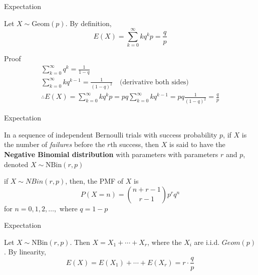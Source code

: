 \documentclass{beamer}
\newcommand{\tb}[1]{\textbf{#1}}
\newcommand{\ti}[1]{\textit{#1}}
\begin{document}
\begin{frame}{Expectation}
    \begin{example} \label{ex:geometric_expectation}
        Let $X \sim \text{Geom}(p)$. By definition,
        \[
            E(X) = \sum^\infty_{k=0} k q ^k p = \frac{q}{p}
        \]
    \end{example}
    \begin{block}{Proof}
        \[
            \begin{gathered}
                \sum^\infty_{k=0} q^k = \frac{1}{1-q}\\
                \sum^{\infty}_{k=0} kq^{k-1} =\frac{1}{(1-q)^2}\quad \text{(derivative both sides)}\\
                \therefore E(X) = \sum^{\infty}_{k=0} k q^k p = pq \sum^\infty_{k=0} k q^{k-1} = pq \frac{1}{(1-q)^2} = \frac{q}{p}
            \end{gathered}
        \]
    \end{block}
\end{frame}

\begin{frame}{Expectation}
    \begin{definition}
        In a sequence of independent Bernoulli trials with success probability $p$, if $X$ is the number of \ti{failures} before the $r$th success, then $X$ is said to have the \tb{Negative Binomial distribution} with parameters with parameters $r$ and $p$, denoted $X \sim \text{NBin}(r, p)$\newline

        if $X \sim NBin(r,p)$, then, the PMF of $X$ is
        \[
            P(X=n) = \binom{n+r-1}{r-1} p^r q^n
        \]
        for $n=0,1,2, \dots, $ where $q=1-p$
    \end{definition}
\end{frame}

\begin{frame}{Expectation}
    \begin{example}
        Let $X \sim \text{NBin}(r,p)$. Then $X = X_1 + \cdots + X_r$, where the $X_i$ are i.i.d. $Geom(p)$. By linearity, 
        \[
            E(X) = E(X_1) + \cdots + E(X_r) = r \cdot \frac{q}{p}
        \]
    \end{example}
\end{frame}
\end{document}
